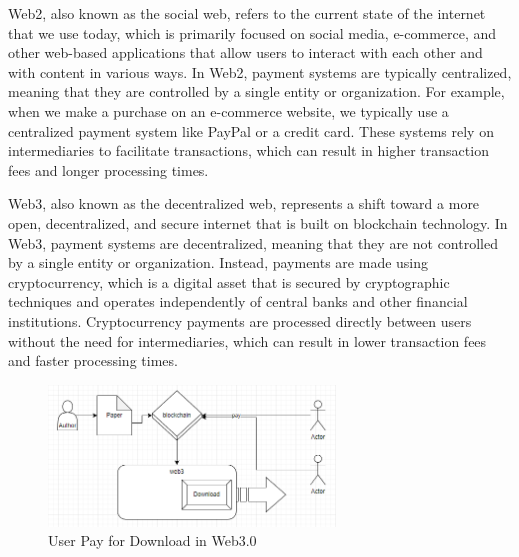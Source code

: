 \documentclass[lettersize,journal]{IEEEtran}
\begin{document}
Web2, also known as the social web, refers to the current state of the internet that we use today, which is primarily focused on social media, e-commerce, and other web-based applications that allow users to interact with each other and with content in various ways. In Web2, payment systems are typically centralized, meaning that they are controlled by a single entity or organization. For example, when we make a purchase on an e-commerce website, we typically use a centralized payment system like PayPal or a credit card. These systems rely on intermediaries to facilitate transactions, which can result in higher transaction fees and longer processing times.

Web3, also known as the decentralized web, represents a shift toward a more open, decentralized, and secure internet that is built on blockchain technology. In Web3, payment systems are decentralized, meaning that they are not controlled by a single entity or organization. Instead, payments are made using cryptocurrency, which is a digital asset that is secured by cryptographic techniques and operates independently of central banks and other financial institutions. Cryptocurrency payments are processed directly between users without the need for intermediaries, which can result in lower transaction fees and faster processing times.

\begin{figure}[h]
  \centering
  \includegraphics[width=3in]{assets/web3.png}
  \caption{User Pay for Download in Web3.0}
  \label{fig:web3}
\end{figure}
\end{document}
